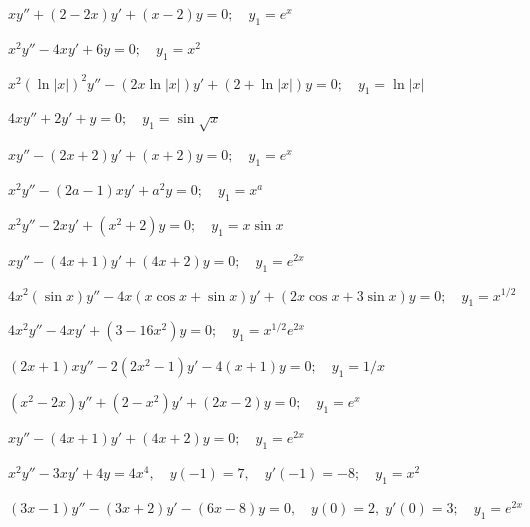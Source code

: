 \begin{exerciselist}

\item\label{exer:5.6.18}$xy''+(2-2x)y'+(x-2)y=0;    \quad y_1=e^x$

\item\label{exer:5.6.19}$x^2y''-4xy'+6y=0;   \quad y_1=x^2$

\item\label{exer:5.6.20}$x^2(\ln |x|)^2y''-(2x \ln |x|)y'+(2+\ln |x|)y=0;   \quad y_1=\ln |x|$

\item\label{exer:5.6.21}$4xy''+2y'+y=0;  \quad y_1=\sin \sqrt{x}$

\item\label{exer:5.6.22}$xy''-(2x+2)y'+(x+2)y=0;   \quad y_1=e^x$

\item\label{exer:5.6.23}$x^2y''-(2a-1)xy'+a^2y=0;   \quad y_1=x^a$

\item\label{exer:5.6.24}$x^2y''-2xy'+(x^2+2)y=0;   \quad y_1=x \sin x$

\item\label{exer:5.6.25}$xy''-(4x+1)y'+(4x+2)y=0;  \quad y_1=e^{2x}$

\item\label{exer:5.6.26}$4x^2(\sin x)y''-4x(x\cos x+\sin x)y'+(2x\cos x+3\sin x)y=0;  \quad
y_1=x^{1/2}$

\item\label{exer:5.6.27}$4x^2y''-4xy'+(3-16x^2)y=0;  \quad y_1=x^{1/2}e^{2x}$

\item\label{exer:5.6.28}$(2x+1)xy''-2(2x^2-1)y'-4(x+1)y=0;  \quad y_1=1/x$

\item\label{exer:5.6.29}$(x^2-2x)y''+(2-x^2)y'+(2x-2)y=0;  \quad y_1=e^x$

\item\label{exer:5.6.30}$xy''-(4x+1)y'+(4x+2)y=0;  \quad y_1=e^{2x}$



\item\label{exer:5.6.31}$x^2y''-3xy'+4y=4x^4,\quad y(-1)=7,\quad  y'(-1)=-8;   \quad y_1=x^2$

\item\label{exer:5.6.32}$(3x-1)y''-(3x+2)y'-(6x-8)y=0, \quad   y(0)=2,\;  y'(0)=3;    \quad
y_1=e^{2x}$


\end{exerciselist}
